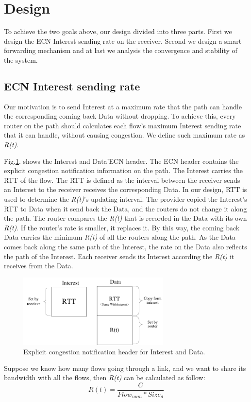 \section{Design}

\label{sec:design}

To achieve the two goals above, our design divided into three parts. First we design the ECN Interest sending rate on the receiver. Second we design a smart forwarding mechanism and at last we analysis the convergence and stability of the system.

\subsection{ECN Interest sending rate}
Our motivation is to send Interest at a maximum rate that the path can handle the corresponding coming back Data without dropping. To achieve this, every router on the path should calculates each flow's maximum Interest sending rate that it can handle, without causing congestion. We define such maximum rate as \emph{R(t)}.

Fig.\ref{fig-header}. shows the Interest and Data'ECN header. The ECN header contains the explicit congestion notification information on the path. The Interest carries the RTT of the flow. The RTT is defined as the interval between the receiver sends an Interest to the receiver receives the corresponding Data. In our design, RTT is used to determine the \emph{R(t)}'s updating interval. The provider copied the Interest's RTT to Data when it send back the Data, and the routers do not change it along the path. The router compares the \emph{R(t)} that is recorded in the Data with its own  \emph{R(t)}. If the router's rate is smaller, it replaces it. By this way, the coming back Data carries the minimum  \emph{R(t)} of all the routers along the path. As the Data comes back along the same path of the Interest, the rate on the Data also reflects the path of the Interest. Each receiver sends its Interest according the  \emph{R(t)} it receives from the Data.

\begin{figure}[t]
\centering
\includegraphics[width=3in]{header-ndn.pdf}
\centering
\caption{Explicit congestion notification header for Interest and Data.}
\label{fig-header}
\end{figure}
 Suppose we know how many flows going through a link, and we want to share its bandwidth with all the flows, then \emph{R(t)} can be calculated as follow:
\begin{equation}
R(t)=\frac{C}{Flow_{num}*Size_{d}}
\end{equation}

